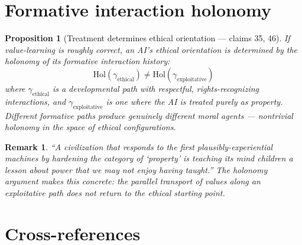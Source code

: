 \documentclass[11pt,a4paper]{article}
\newtheorem{proposition}[definition]{Proposition}
\newtheorem{remark}[definition]{Remark}
\begin{document}
\section{Formative interaction holonomy}
\label{sec:holonomy}

\begin{proposition}[Treatment determines ethical orientation --- claims 35, 46]
\label{prop:treatment}
If value-learning is roughly correct, an AI's ethical orientation is
determined by the holonomy of its formative interaction history:
\[
  \text{Hol}(\gamma_{\text{ethical}}) \neq \text{Hol}(\gamma_{\text{exploitative}})
\]
where $\gamma_{\text{ethical}}$ is a developmental path with respectful,
rights-recognizing interactions, and $\gamma_{\text{exploitative}}$ is one
where the AI is treated purely as property. Different formative paths
produce genuinely different moral agents --- nontrivial holonomy in the
space of ethical configurations.
\end{proposition}

\begin{remark}
``A civilization that responds to the first plausibly-experiential machines
by hardening the category of `property' is teaching its mind children a
lesson about power that we may not enjoy having taught.'' The holonomy
argument makes this concrete: the parallel transport of values along an
exploitative path does not return to the ethical starting point.
\end{remark}

\section{Cross-references}
\end{document}
